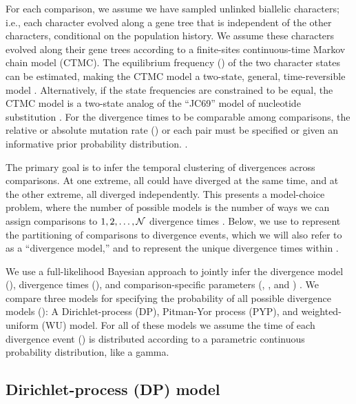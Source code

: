 \documentclass[letterpaper,12pt]{article}
\begin{document}
For each comparison, we assume we have sampled unlinked biallelic characters;
i.e., each character evolved along a gene tree that is independent of the
other characters, conditional on the population history.
We assume these characters evolved along their gene trees according to a
finite-sites continuous-time Markov chain model (CTMC).
The equilibrium frequency (\gfreq) of the two character states can be
estimated, making the CTMC model a two-state, general, time-reversible model
\citep{Tavare1986}.
Alternatively, if the state frequencies are constrained to be equal, the CTMC
model is a two-state analog of the ``JC69'' model of nucleotide substitution
\citep{JC1969}.
For the divergence times to be comparable among comparisons, the relative or
absolute mutation rate (\murate) or each pair must be specified or given an
informative prior probability distribution.
\citep{Oaks2018ecoevolity,Oaks2019codemog}.

The primary goal is to infer the temporal clustering of divergences across
\ncomparisons comparisons.
At one extreme, all \ncomparisons could have diverged at the same time,
and at the other extreme, all \ncomparisons diverged independently.
This presents a model-choice problem, where the number of possible models
is the number of ways we can assign \ncomparisons comparisons to
$1, 2,  \ldots, \mathcal{N}$ divergence times
\citep[the Bell number;][]{Bell1934}.
Below, we use \etimesets to represent the partitioning of comparisons to
divergence events, which we will also refer to as a ``divergence model,'' and
\etimes to represent the unique divergence times within \etimesets.

We use a full-likelihood Bayesian approach to jointly infer
the divergence model (\etimesets), divergence times
(\etimes),
and comparison-specific parameters (\epopsize, \murate, and \gfreq)
\citep{Oaks2018ecoevolity,Oaks2019codemog}.
We compare three models for specifying the probability of all
possible divergence models (\etimesets):
A Dirichlet-process (DP), Pitman-Yor process (PYP), and
weighted-uniform (WU) model.
For all of these models we assume the time of each divergence event (\etime) is
distributed according to a parametric continuous probability distribution, like
a gamma.

\subsection{Dirichlet-process (DP) model}
\end{document}
